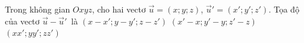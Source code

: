 \begin{ex}%
	Trong không  gian $Oxyz$, cho hai vectơ $\overrightarrow{u}=(x;y;z)$, $\overrightarrow{u}'=\left(x';y';z'\right)$. Tọa độ của vectơ $\overrightarrow{u}-\overrightarrow{u}'$~là
		{\True $\left(x-x'; y-y';  z-z'\right)$}
		{$\left(x'-x;  y'-y; z'-z\right)$}
		 {$\left(x x'; y y'; z z'\right)$}
\end{ex}
